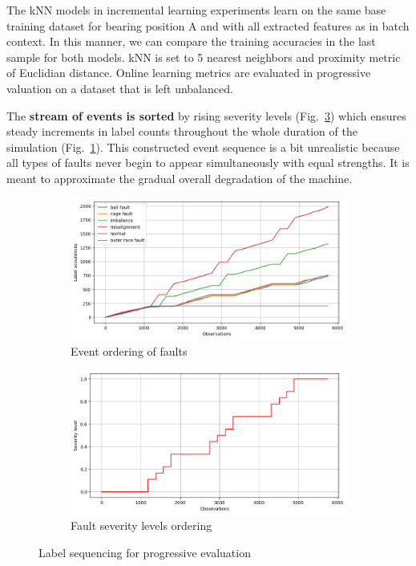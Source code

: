 The kNN models in incremental learning experiments learn on the same base training dataset for bearing position A and with all extracted features as in batch context. In this manner, we can compare the training accuracies in the last sample for both models. kNN is set to 5 nearest neighbors and proximity metric of Euclidian distance. Online learning metrics are evaluated in progressive valuation on a dataset that is left unbalanced.

The \textbf{stream of events is sorted} by rising severity levels (Fig.~\ref{fig:design:online-count-severity-level}) which ensures steady increments in label counts throughout the whole duration of the simulation (Fig.~\ref{fig:design:online-event-order}). This constructed event sequence is a bit unrealistic because all types of faults never begin to appear simultaneously with equal strengths. It is meant to approximate the gradual overall degradation of the machine. 

\begin{figure}[ht]
    \centering
    \begin{subfigure}[b]{0.49\textwidth}
        \includegraphics[width=\textwidth]{assets/design/Online-event-ordering-fault-train.png}
        \caption{Event ordering of faults}
        \label{fig:design:online-event-order}
    \end{subfigure}
    \hfill
    \begin{subfigure}[b]{0.49\textwidth}
        \includegraphics[width=\textwidth]{assets/design/Online-severity-levels.png}
        \caption{Fault severity levels ordering}
        \label{fig:design:online-count-severity-level}
    \end{subfigure}
    \caption{Label sequencing for progressive evaluation}
\end{figure}

